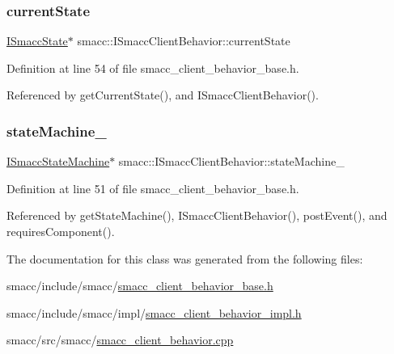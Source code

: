 \subsubsection{\texorpdfstring{current\+State}{currentState}}
{\footnotesize\ttfamily \hyperlink{classsmacc_1_1ISmaccState}{I\+Smacc\+State}$\ast$ smacc\+::\+I\+Smacc\+Client\+Behavior\+::current\+State\hspace{0.3cm}{\ttfamily [private]}}



Definition at line 54 of file smacc\+\_\+client\+\_\+behavior\+\_\+base.\+h.



Referenced by get\+Current\+State(), and I\+Smacc\+Client\+Behavior().

\mbox{\label{classsmacc_1_1ISmaccClientBehavior_a0fea65db292a8bb3dfba3e5840491d79}} 
\subsubsection{\texorpdfstring{state\+Machine\+\_\+}{stateMachine\_}}
{\footnotesize\ttfamily \hyperlink{classsmacc_1_1ISmaccStateMachine}{I\+Smacc\+State\+Machine}$\ast$ smacc\+::\+I\+Smacc\+Client\+Behavior\+::state\+Machine\+\_\+\hspace{0.3cm}{\ttfamily [private]}}



Definition at line 51 of file smacc\+\_\+client\+\_\+behavior\+\_\+base.\+h.



Referenced by get\+State\+Machine(), I\+Smacc\+Client\+Behavior(), post\+Event(), and requires\+Component().



The documentation for this class was generated from the following files\+:\begin{DoxyCompactItemize}
\item 
smacc/include/smacc/\hyperlink{include_2smacc_2smacc__client__behavior__base_8h}{smacc\+\_\+client\+\_\+behavior\+\_\+base.\+h}\item 
smacc/include/smacc/impl/\hyperlink{smacc__client__behavior__impl_8h}{smacc\+\_\+client\+\_\+behavior\+\_\+impl.\+h}\item 
smacc/src/smacc/\hyperlink{smacc__client__behavior_8cpp}{smacc\+\_\+client\+\_\+behavior.\+cpp}\end{DoxyCompactItemize}
